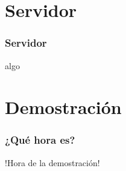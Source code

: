   
  
  
  
  
  
  
  
  
\section{Servidor}
  \begin{frame}
    \frametitle{Servidor}
    algo
  \end{frame}

\section{Demostración}
\begin{frame}
  \frametitle{¿Qué hora es?}
  \centering
  \large !Hora de la demostración!
\end{frame}

